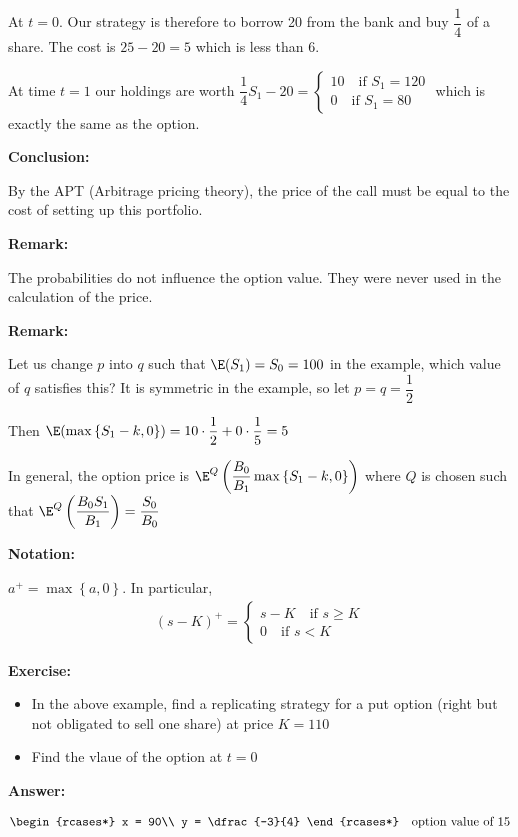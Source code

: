 \noindent At $t = 0$. Our strategy is therefore to borrow 20 from the bank and buy $\dfrac{1}{4}$ of a share. The cost is $25-20 = 5$ which is less than 6. \par
\noindent At time $t = 1$ our holdings are worth $\dfrac{1}{4}S_1-20 = \begin{cases}10\quad\text{if } S_1 = 120\\0\quad\text{if } S_1 = 80\end{cases}$ which is exactly the same as the option.
\par\bigskip
\noindent\textbf{Conclusion:}\par
\noindent By the APT (Arbitrage pricing theory), the price of the call must be equal to the cost of setting up this portfolio.
\par\bigskip
\noindent\textbf{Remark:}\par
\noindent The probabilities do not influence the option value. They were never used in the calculation of the price.
\par\bigskip
\noindent\textbf{Remark:}\par
\noindent Let us change $p$ into $q$ such that $\E(S_1) = S_0 = 100$ in the example, which value of $q$ satisfies this? It is symmetric in the example, so let $p = q = \dfrac{1}{2}$\par
\noindent Then $\E(\max\left\{S_1-k,0\right\}) = 10\cdot\dfrac{1}{2}+0\cdot\dfrac{1}{5} = 5$ \par
\noindent In general, the option price is $\E^Q\left(\dfrac{B_0}{B_1}\max\left\{S_1-k,0\right\}\right)$ where $Q$ is chosen such that $\E^Q\left(\dfrac{B_0S_1}{B_1}\right) = \dfrac{S_0}{B_0}$
\par\bigskip
\noindent\textbf{Notation:}\par
\noindent $a^+ = \max\left\{a,0\right\}$. In particular, 
\begin{equation*}
  \begin{gathered}
    (s-K)^+ = \begin{cases}s-K\quad\text{if } s\geq K\\0\quad\text{if } s<K\end{cases}
  \end{gathered}
\end{equation*}
\par\bigskip
\noindent\textbf{Exercise:}\par
\begin{itemize}
  \item In the above example, find a replicating strategy for a put option (right but not obligated to sell one share) at price $K = 110$
  \item Find the vlaue of the option at $t = 0$
\end{itemize}
\par\bigskip
\noindent\textbf{Answer:}\par
\begin{equation*}
  \begin{gathered}
    \begin{rcases*}
      x = 90\\
      y = \dfrac{-3}{4}
    \end{rcases*}\quad\text{option value of 15}
  \end{gathered}
\end{equation*}
